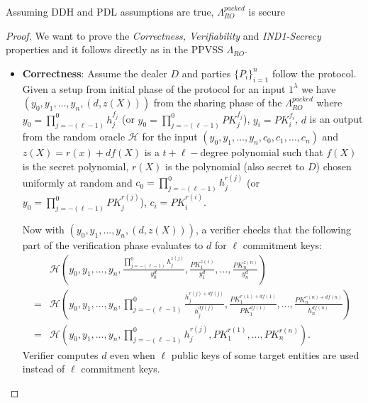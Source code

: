 \begin{theorem}
  Assuming DDH and PDL assumptions are true, $\Lambda_{RO}^{packed}$ is secure
\end{theorem}
\begin{proof}
  We want to prove the \textit{Correctness, Verifiability} and \textit{IND1-Secrecy} properties and it follows 
  directly as in the PPVSS $\Lambda_{RO}$.
  \begin{itemize}
    \item \textbf{Correctness}: Assume the dealer $D$ and parties $\{P_i\}_{i=1}^n$ follow the protocol. Given a 
      setup from initial phase of the protocol for an input $1^\lambda$ we have $(y_0,y_1,\dots,y_n,(d,z(X)))$ from 
      the sharing phase of the $\Lambda_{RO}^{packed}$ where 
      $y_0=\prod_{j=-(\ell-1)}^{0}h_j^{f_j}$ (or $y_0=\prod_{j=-(\ell-1)}^0PK_j^{f_j}$), $y_i=PK_i^{f_i}$, $d$ is an output 
      from the random oracle $\mathcal{H}$ for the input $(y_0,y_1,\dots,y_n,c_0,c_1,\dots,c_n)$ and $z(X)=r(x)+df(X)$ 
      is a $t+\ell-$degree polynomial such that $f(X)$ is the secret polynomial, $r(X)$ is the polynomial (also secret to $D$) 
      chosen uniformly at random and $c_0=\prod_{j=-(\ell-1)}^{0}h_j^{r(j)}$ (or $y_0=\prod_{j=-(\ell-1)}^0PK_j^{r(j)}$), $c_i=PK_i^{r(i)}$.\par 

      Now with $(y_0,y_1,\dots,y_n,(d,z(X)))$, a verifier checks that the following part of the verification phase evaluates to $d$ 
      for $\ell$ commitment keys:
      \begin{align*}
        &\mathcal{H}(y_0,y_1,\dots,y_n,\frac{\prod_{j=-(\ell-1)}^{0}h_j^{z(j)}}{y_0^d},\frac{PK_1^{z(1)}}{y_1^d},\dots,\frac{PK_n^{z(n)}}{y_n^d})\\
        =&\mathcal{H}(y_0,y_1,\dots,y_n,\prod_{j=-(\ell-1)}^{0}\frac{h_j^{r(j)+df(j)}}{h_j^{df(j)}},\frac{PK_1^{r(1)+df(1)}}{PK_1^{df(1)}},\dots,\frac{PK_n^{r(n)+df(n)}}{h_n^{df(n)}})\\
        =&\mathcal{H}(y_0,y_1,\dots,y_n,\prod_{j=-(\ell-1)}^{0}h_j^{r(j)},PK_1^{r(1)},\dots,PK_n^{r(n)}).
      \end{align*}
      Verifier computes $d$ even when $\ell$ public keys of some target entities are used instead of $\ell$ commitment 
      keys.\par 
      

\end{itemize}
\end{proof}
